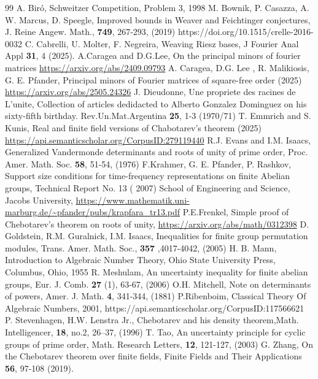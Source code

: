 \documentclass[10pt,a4paper]{amsart}
\begin{document}
\begin{thebibliography}{99}
 A. Bir\'o, Schweitzer Competition, Problem 3, 1998
 M. Bownik, P. Casazza, A. W. Marcus, D. Speegle, Improved bounds in Weaver and Feichtinger conjectures, J. Reine Angew. Math., {\bf 749}, 267-293, (2019) https://doi.org/10.1515/crelle-2016-0032
 C. Cabrelli, U. Molter, F. Negreira, Weaving Riesz bases, J Fourier Anal Appl {\bf 31}, 4 (2025).
 A.Caragea and D.G.Lee, On the principal minors of fourier matrices \url{https://arxiv.org/abs/2409.09793}
 A. Caragea, D.G. Lee , R. Malikiosis, G. E. Pfander, Principal minors of Fourier matrices of square-free order (2025) \url{https://arxiv.org/abs/2505.24326}
 J. Dieudonne, Une propriete des racines de L'unite, Collection of articles dedidacted to Alberto Gonzalez Dominguez on his sixty-fifth birthday. Rev.Un.Mat.Argentina {\bf 25}, 1-3 (1970/71)
 T. Emmrich and S. Kunis, Real and finite field versions of Chabotarev's theorem (2025) \url{https://api.semanticscholar.org/CorpusID:279119440}
 R.J. Evans and I.M. Isaacs, Generalized Vandermonde determinants and roots of unity of prime order, Proc. Amer. Math. Soc. {\bf 58}, 51-54, (1976)
 F.Krahmer, G. E. Pfander, P. Rashkov, Support size conditions for time-frequency representations on finite Abelian groups, Technical Report No. 13 ( 2007) School of Engineering and Science, Jacobs University, \url{https://www.mathematik.uni-marburg.de/~pfander/pubs/krapfara_tr13.pdf}
 P.E.Frenkel, Simple proof of Chebotarev's theorem on roots of unity, \url{https://arxiv.org/abs/math/0312398}
 D. Goldstein, R.M. Guralnick, I.M. Isaacs, Inequalities for finite group permutation modules, Trans. Amer. Math. Soc., {\bf 357 },4017-4042, (2005)
 H. B. Mann, Introduction to Algebraic Number Theory, Ohio State University Press, Columbus, Ohio, 1955
 R. Meshulam, An uncertainty inequality for finite abelian groups, Eur. J. Comb. {\bf 27 } (1), 63-67, (2006)
 O.H. Mitchell, Note on determinants of powers, Amer. J. Math. {\bf 4}, 341-344, (1881)
 P.Ribenboim, Classical Theory Of Algebraic Numbers, 2001, https://api.semanticscholar.org/CorpusID:117566621
 P. Stevenhagen, H.W. Lenstra Jr., Chebotarev and his density theorem,Math. Intelligencer, {\bf 18}, no.2, 26--37, (1996)
 T. Tao, An uncertainty principle for cyclic groups of prime order, Math. Research Letters, {\bf 12}, 121-127, (2003)
 G. Zhang, On the Chebotarev theorem over finite fields, Finite Fields and Their Applications {\bf56}, 97-108 (2019).
\end{thebibliography}
\end{document}
